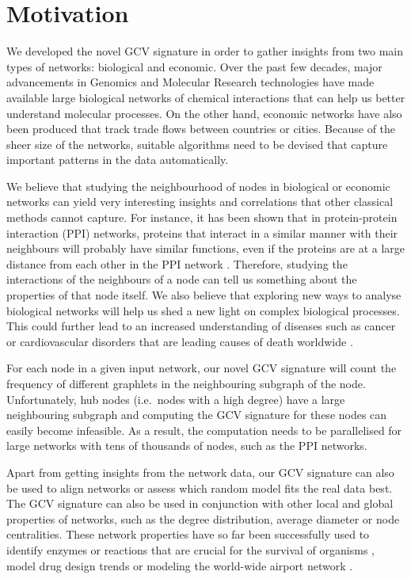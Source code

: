 \section{Motivation}

We developed the novel GCV signature in order to gather insights from two main types of networks: biological and economic. Over the past few decades, major advancements in Genomics and Molecular Research technologies have made available large biological networks of chemical interactions that can help us better understand molecular processes. On the other hand, economic networks have also been produced that track trade flows between countries or cities. Because of the sheer size of the networks, suitable algorithms need to be devised that capture important patterns in the data automatically. 

We believe that studying the neighbourhood of nodes in biological or economic networks can yield very interesting insights and correlations that other classical methods cannot capture. For instance, it has been shown that in protein-protein interaction (PPI) networks, proteins that interact in a similar manner with their neighbours will probably have similar functions, even if the proteins are at a large distance from each other in the PPI network \cite{schwikowski2000network}. Therefore, studying the interactions of the neighbours of a node can tell us something about the properties of that node itself. We also believe that exploring new ways to analyse biological networks will help us shed a new light on complex biological processes. This could further lead to an increased understanding of diseases such as cancer or cardiovascular disorders that are leading causes of death worldwide \cite{jemal2008cancer,world2004annex}.

For each node in a given input network, our novel GCV signature will count the frequency of different graphlets in the neighbouring subgraph of the node. Unfortunately, hub nodes (i.e.\ nodes with a high degree) have a large neighbouring subgraph and computing the GCV signature for these nodes can easily become infeasible. As a result, the computation needs to be parallelised for large networks with tens of thousands of nodes, such as the PPI networks.

Apart from getting insights from the network data, our GCV signature can also be used to align networks or assess which random model fits the real data best. The GCV signature can also be used in conjunction with other local and global properties of networks, such as the degree distribution,
average diameter or node centralities. These network properties have so far been successfully used to identify enzymes or reactions that are crucial for the survival of organisms \cite{rahman2006observing}, model drug design trends \cite{yildirim2007drug} or modeling the world-wide airport network \cite{guimera2004modeling}.

